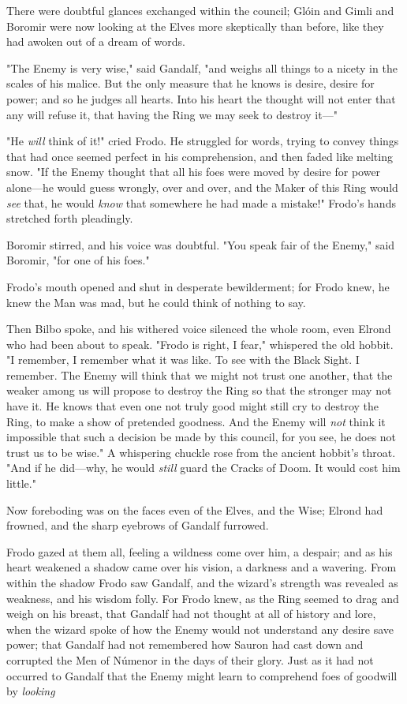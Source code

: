 There were doubtful glances exchanged within the council; Glóin and Gimli and
Boromir were now looking at the Elves more skeptically than before, like they
had awoken out of a dream of words.

"The Enemy is very wise," said Gandalf, "and weighs all things to a nicety in
the scales of his malice. But the only measure that he knows is desire, desire
for power; and so he judges all hearts. Into his heart the thought will not
enter that any will refuse it, that having the Ring we may seek to destroy
it---"

"He \emph{will} think of it!" cried Frodo. He struggled for words, trying to
convey things that had once seemed perfect in his comprehension, and then faded
like melting snow. "If the Enemy thought that all his foes were moved by desire
for power alone---he would guess wrongly, over and over, and the Maker of this
Ring would \emph{see} that, he would \emph{know} that somewhere he had made a
mistake!" Frodo's hands stretched forth pleadingly.

Boromir stirred, and his voice was doubtful. "You speak fair of the Enemy,"
said Boromir, "for one of his foes."

Frodo's mouth opened and shut in desperate bewilderment; for Frodo knew, he
knew the Man was mad, but he could think of nothing to say.

Then Bilbo spoke, and his withered voice silenced the whole room, even Elrond
who had been about to speak. "Frodo is right, I fear," whispered the old
hobbit. "I remember, I remember what it was like. To see with the Black Sight.
I remember. The Enemy will think that we might not trust one another, that the
weaker among us will propose to destroy the Ring so that the stronger may not
have it. He knows that even one not truly good might still cry to destroy the
Ring, to make a show of pretended goodness. And the Enemy will \emph{not} think
it impossible that such a decision be made by this council, for you see, he
does not trust us to be wise." A whispering chuckle rose from the ancient
hobbit's throat. "And if he did---why, he would \emph{still} guard the Cracks
of Doom. It would cost him little."

Now foreboding was on the faces even of the Elves, and the Wise; Elrond had
frowned, and the sharp eyebrows of Gandalf furrowed.

Frodo gazed at them all, feeling a wildness come over him, a despair; and as
his heart weakened a shadow came over his vision, a darkness and a wavering.
From within the shadow Frodo saw Gandalf, and the wizard's strength was
revealed as weakness, and his wisdom folly. For Frodo knew, as the Ring seemed
to drag and weigh on his breast, that Gandalf had not thought at all of history
and lore, when the wizard spoke of how the Enemy would not understand any
desire save power; that Gandalf had not remembered how Sauron had cast down and
corrupted the Men of Númenor in the days of their glory. Just as it had not
occurred to Gandalf that the Enemy might learn to comprehend foes of goodwill
by \emph{looking{\el}}

